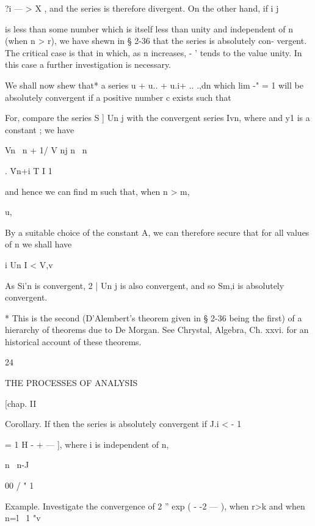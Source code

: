 ?i — > X , and the series is therefore divergent. On the other hand, if i   j 

is less than some number which is itself less than unity and independent 
of n (when n > r), we have shewn in § 2-36 that the series is absolutely con- 
vergent. The critical case is that in which, as n increases, -  ' tends to 
the value unity. In this case a further investigation is necessary. 

We shall now shew that* a series u  + u.. + u.i+ .. .,dn which lim -"  = 1 
will be absolutely convergent if a positive number c exists such that 

For, compare the series S ] Un j with the convergent series Ivn, where 
and y1 is a constant ; we have 



Vn \ n + 1/ V   nj n \ n 

. \'Vn+i T I   1   

and hence we can find m such that, when n > m, 



u, 






By a suitable choice of the constant A, we can therefore secure that for 
all values of n we shall have 

i Un I < V,v 

As Si'n is convergent, 2 | Un j is also convergent, and so Sm,i is absolutely 
convergent. 

* This is the second (D'Alembert's theorem given in § 2-36 being the first) of a hierarchy of 
theorems due to De Morgan. See Chrystal, Algebra, Ch. xxvi. for an historical account of 
these theorems. 



24 



THE PROCESSES OF ANALYSIS 



[chap. II 






Corollary. If 
then the series is absolutely convergent if J.i < - 1 



= 1 H  - +   — ], where  i is independent of n, 

n \ n-J 



00 / " 1 \ 

Example. Investigate the convergence of 2  '' exp ( - -2 — ), when r>k and when 
  n=l \ 1 "v 



